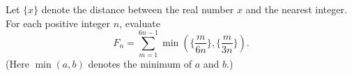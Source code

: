 Let $\{x\}$ denote the distance between the real number $x$ and the
nearest integer.  For each positive integer $n$, evaluate
\[F_n=\sum_{m=1}^{6n-1} \min(\{\frac{m}{6n}\},\{\frac{m}{3n}\}).\]
(Here $\min(a,b)$ denotes the minimum of $a$ and $b$.)
